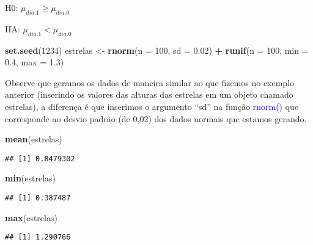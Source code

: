 \documentclass[titlepage, oneside, openany, a4paper]{book}
\newenvironment{Shaded}{\begin{snugshade}}{\end{snugshade}}
\newcommand{\DataTypeTok}[1]{\textcolor[rgb]{0.13,0.29,0.53}{#1}}
\newcommand{\DecValTok}[1]{\textcolor[rgb]{0.00,0.00,0.81}{#1}}
\newcommand{\FloatTok}[1]{\textcolor[rgb]{0.00,0.00,0.81}{#1}}
\newcommand{\KeywordTok}[1]{\textcolor[rgb]{0.13,0.29,0.53}{\textbf{#1}}}
\newcommand{\NormalTok}[1]{#1}
\newcommand{\OperatorTok}[1]{\textcolor[rgb]{0.81,0.36,0.00}{\textbf{#1}}}
\newcommand{\StringTok}[1]{\textcolor[rgb]{0.31,0.60,0.02}{#1}}
\begin{document}
H0: \(\mu_{dia.1} \geq \mu_{dia.0}\)

HA: \(\mu_{dia.1} < \mu_{dia.0}\)

\begin{Shaded}
\begin{Highlighting}[]
\KeywordTok{set.seed}\NormalTok{(}\DecValTok{1234}\NormalTok{)}
\NormalTok{estrelas <-}\StringTok{ }\KeywordTok{rnorm}\NormalTok{(}\DataTypeTok{n =} \DecValTok{100}\NormalTok{, }\DataTypeTok{sd =} \FloatTok{0.02}\NormalTok{) }\OperatorTok{+}\StringTok{ }\KeywordTok{runif}\NormalTok{(}\DataTypeTok{n =} \DecValTok{100}\NormalTok{, }\DataTypeTok{min =} \FloatTok{0.4}\NormalTok{, }\DataTypeTok{max =} \FloatTok{1.3}\NormalTok{)}
\end{Highlighting}
\end{Shaded}

Observe que geramos os dados de maneira similar ao que fizemos no exemplo anterior (inserindo os valores das alturas das estrelas em um objeto chamado estrelas), a diferença é que inserimos o argumento ``sd'' na função \textcolor{blue}{rnorm()} que corresponde ao desvio padrão (de 0,02) dos dados normais que estamos gerando.

\begin{Shaded}
\begin{Highlighting}[]
\KeywordTok{mean}\NormalTok{(estrelas)}
\end{Highlighting}
\end{Shaded}

\begin{verbatim}
## [1] 0.8479302
\end{verbatim}

\begin{Shaded}
\begin{Highlighting}[]
\KeywordTok{min}\NormalTok{(estrelas)}
\end{Highlighting}
\end{Shaded}

\begin{verbatim}
## [1] 0.387487
\end{verbatim}

\begin{Shaded}
\begin{Highlighting}[]
\KeywordTok{max}\NormalTok{(estrelas)}
\end{Highlighting}
\end{Shaded}

\begin{verbatim}
## [1] 1.290766
\end{verbatim}
\end{document}
